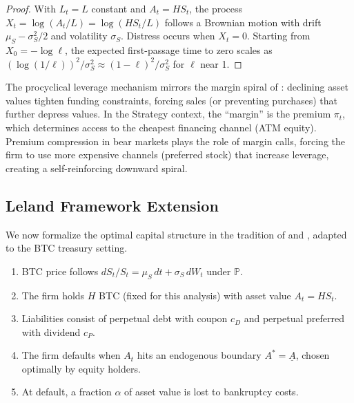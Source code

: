 \begin{proof}
With $L_t = L$ constant and $A_t = H S_t$, the process
$X_t = \log(A_t / L) = \log(H S_t / L)$ follows a Brownian motion with
drift $\mu_S - \sigma_S^2/2$ and volatility $\sigma_S$.  Distress occurs
when $X_t = 0$.  Starting from $X_0 = -\log\ell$, the expected first-passage
time to zero scales as $(\log(1/\ell))^2 / \sigma_S^2
\approx (1-\ell)^2 / \sigma_S^2$ for $\ell$ near 1.
\end{proof}

\begin{remark}
The procyclical leverage mechanism mirrors the margin spiral of
\citet{brunnermeier2009market}: declining asset values tighten funding
constraints, forcing sales (or preventing purchases) that further depress
values.  In the Strategy context, the ``margin'' is the premium $\pi_t$,
which determines access to the cheapest financing channel (ATM equity).
Premium compression in bear markets plays the role of margin calls,
forcing the firm to use more expensive channels (preferred stock) that
increase leverage, creating a self-reinforcing downward spiral.
\end{remark}

\subsection{Leland Framework Extension}\label{subsec:leland}

We now formalize the optimal capital structure in the tradition of
\citet{leland1994} and \citet{leland1996}, adapted to the
BTC treasury setting.

\begin{assumption}\label{ass:leland_btc}
\begin{enumerate}
  \item BTC price follows $dS_t/S_t = \mu_S\,dt + \sigma_S\,dW_t$ under
    $\mathbb{P}$.
  \item The firm holds $H$ BTC (fixed for this analysis) with asset value
    $A_t = H S_t$.
  \item Liabilities consist of perpetual debt with coupon $c_D$ and
    perpetual preferred with dividend $c_P$.
  \item The firm defaults when $A_t$ hits an endogenous boundary
    $A^* = \underline{A}$, chosen optimally by equity holders.
  \item At default, a fraction $\alpha$ of asset value is lost to
    bankruptcy costs.
\end{enumerate}
\end{assumption}

